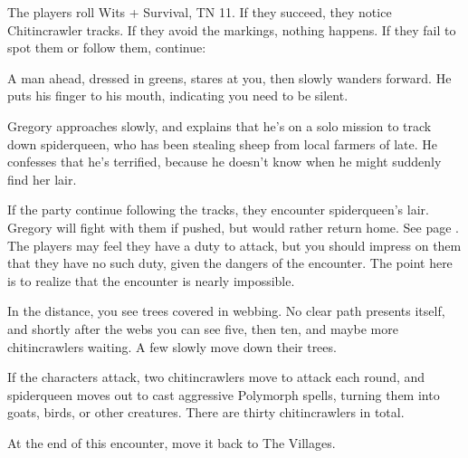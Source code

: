 \begin{multicols}{2}
\chitincrawler


The players roll Wits + Survival, TN 11.  If they succeed, they notice Chitincrawler tracks.  If they avoid the markings, nothing happens.  If they fail to spot them or follow them, continue:

\begin{boxtext}

	A man ahead, dressed in greens, stares at you, then slowly wanders forward.  He puts his finger to his mouth, indicating you need to be silent.

\end{boxtext}

Gregory approaches slowly, and explains that he's on a solo mission to track down \gls{spiderqueen}, who has been stealing sheep from local farmers of late.  He confesses that he's terrified, because he doesn't know when he might suddenly find her lair.

If the party continue following the tracks, they encounter \gls{spiderqueen}'s lair.  Gregory will fight with them if pushed, but would rather return home.  See page \pageref{spiderqueen}.  The players may feel they have a duty to attack, but you should impress on them that they have no such duty, given the dangers of the encounter.  The point here is to realize that the encounter is nearly impossible.

\begin{boxtext}
	In the distance, you see trees covered in webbing.  No clear path presents itself, and shortly after the webs you can see five, then ten, and maybe more chitincrawlers waiting.  A few slowly move down their trees.
\end{boxtext}

If the characters attack, two chitincrawlers move to attack each round, and \gls{spiderqueen} moves out to cast aggressive Polymorph spells, turning them into goats, birds, or other creatures.
There are thirty chitincrawlers in total.

At the end of this encounter, move it back to The Villages.


\humansoldier


\begin{boxtext}


\end{boxtext}
\end{multicols}
